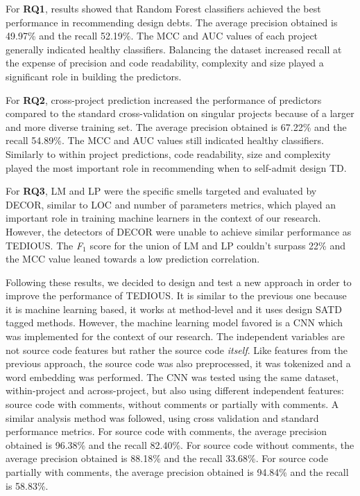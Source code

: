 For \textbf{RQ1}, results showed that Random Forest classifiers achieved the best performance in recommending design debts. The average precision obtained is 49.97\% and the recall 52.19\%. The MCC and AUC values of each project generally indicated healthy classifiers. Balancing the dataset increased recall at the expense of precision and code readability, complexity and size played a significant role in building the predictors. \par

For \textbf{RQ2}, cross-project prediction increased the performance of predictors compared to the standard cross-validation on singular projects because of a larger and more diverse training set. The average precision obtained is 67.22\% and the recall 54.89\%. The MCC and AUC values still indicated healthy classifiers. Similarly to within project predictions, code readability, size and complexity played the most important role in recommending when to self-admit design \ac{TD}. \par

For \textbf{RQ3}, \ac{LM} and \ac{LP} were the specific smells targeted and evaluated by \ac{DECOR}, similar to \ac{LOC} and number of parameters metrics, which played an important role in training machine learners in the context of our research. However, the detectors of \ac{DECOR} were unable to achieve similar performance as \ac{TEDIOUS}. The \emph{F$_{1}$} score for the union of \ac{LM} and \ac{LP} couldn't surpass 22\% and the \ac{MCC} value leaned towards a low prediction correlation. \par

Following these results, we decided to design and test a new approach in order to improve the performance of \ac{TEDIOUS}. It is similar to the previous one because it is machine learning based, it works at method-level and it uses design \ac{SATD} tagged methods. However, the machine learning model favored is a \ac{CNN} which was implemented for the context of our research. The independent variables are not source code features but rather the source code \emph{itself}. Like features from the previous approach, the source code was also preprocessed, it was tokenized and a word embedding was performed. The \ac{CNN} was tested using the same dataset, within-project and across-project, but also using different independent features: source code with comments, without comments or partially with comments. A similar analysis method was followed, using cross validation and standard performance metrics. For source code with comments, the average precision obtained is 96.38\% and the recall 82.40\%. For source code without comments, the average precision obtained is 88.18\% and the recall 33.68\%. For source code partially with comments, the average precision obtained is 94.84\% and the recall is 58.83\%.

